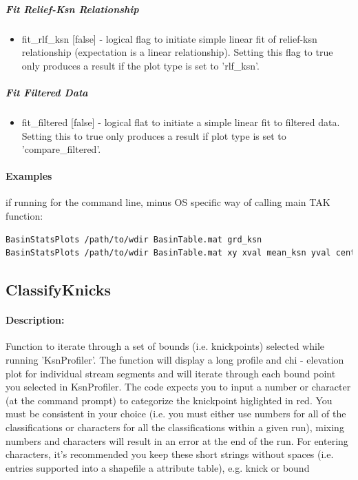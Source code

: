 \subparagraph{Fit Relief-Ksn Relationship}
\begin{itemize}
\item fit\_rlf\_ksn [false] - logical flag to initiate simple linear fit of relief-ksn relationship (expectation is a linear relationship). Setting this
flag to true only produces a result if the plot type is set to 'rlf\_ksn'.
\end{itemize}

\subparagraph{Fit Filtered Data}
\begin{itemize}
\item fit\_filtered [false] - logical flat to initiate a simple linear fit to filtered data. Setting this to true only produces a result if plot type
is set to 'compare\_filtered'.
\end{itemize}

\paragraph{Examples} if running for the command line, minus OS specific way of calling main TAK function:
\begin{lstlisting}[language=bash]
BasinStatsPlots /path/to/wdir BasinTable.mat grd_ksn
BasinStatsPlots /path/to/wdir BasinTable.mat xy xval mean_ksn yval center_x
\end{lstlisting}


\subsection{ClassifyKnicks}

\paragraph{Description:}
Function to iterate through a set of bounds (i.e. knickpoints) selected while running 'KsnProfiler'. The function 
will display a long profile and chi - elevation plot for individual stream segments and will iterate through each
bound point you selected in KsnProfiler. The code expects you to input a number or character (at the command prompt)
to categorize the knickpoint higlighted in red. You must be consistent in your choice (i.e. you must either use 
numbers for all of the classifications or characters for all the classifications within a given run), mixing numbers 
and characters will result in an error at the end of the run. For entering characters, it's recommended you keep these 
short strings without spaces (i.e. entries supported into a shapefile a attribute table), e.g. knick or bound  

